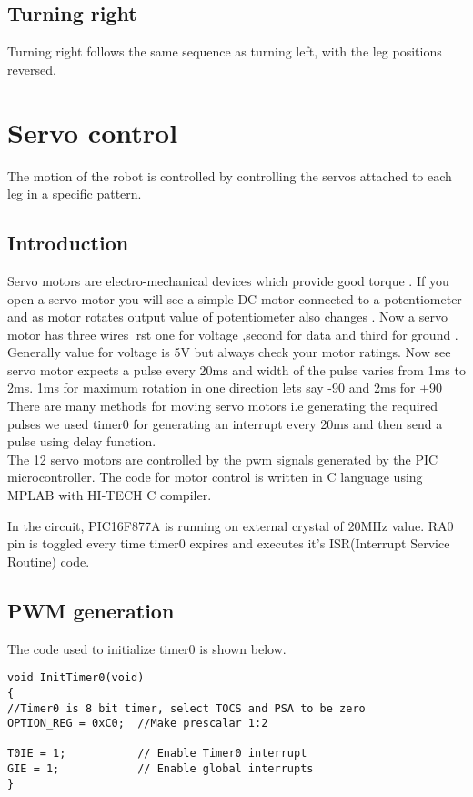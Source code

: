 \documentclass{report}
\begin{document}
\subsection{Turning right}
Turning right follows the same sequence as turning left, with the leg positions reversed.\\
\section{Servo control}
The motion of the robot is controlled by controlling the servos attached to each leg in a specific pattern.
\subsection*{Introduction}
Servo motors are electro-mechanical devices which provide good torque . If you open a servo motor you will
see a simple DC motor connected to a potentiometer and as motor rotates output value of potentiometer
also changes . Now a servo motor has three wires rst one for voltage ,second for data and third for ground
. Generally value for voltage is 5V but always check your motor ratings. Now see servo motor expects a
pulse every 20ms and width of the pulse varies from 1ms to 2ms. 1ms for maximum rotation in one direction
lets say -90 and 2ms for +90\\
There are many methods for moving servo motors i.e generating the required pulses we used timer0 for generating an interrupt every 20ms and then send
a pulse using delay function.\\
The 12 servo motors are controlled by the pwm signals generated by the PIC microcontroller.
The  code for motor control is written in C language using MPLAB with HI-TECH C compiler. 

In the circuit, PIC16F877A is running on external crystal of 20MHz value. RA0 pin is toggled every time timer0 expires and executes it's ISR(Interrupt Service Routine) code.\\
\subsection*{PWM generation}
The code used to initialize timer0 is shown below.\\

\begin{lstlisting}[caption=Timer0 Initialisation]
void InitTimer0(void)
{
//Timer0 is 8 bit timer, select TOCS and PSA to be zero
OPTION_REG = 0xC0;	//Make prescalar 1:2

T0IE = 1;			// Enable Timer0 interrupt
GIE = 1;			// Enable global interrupts
}
\end{lstlisting}
\end{document}

